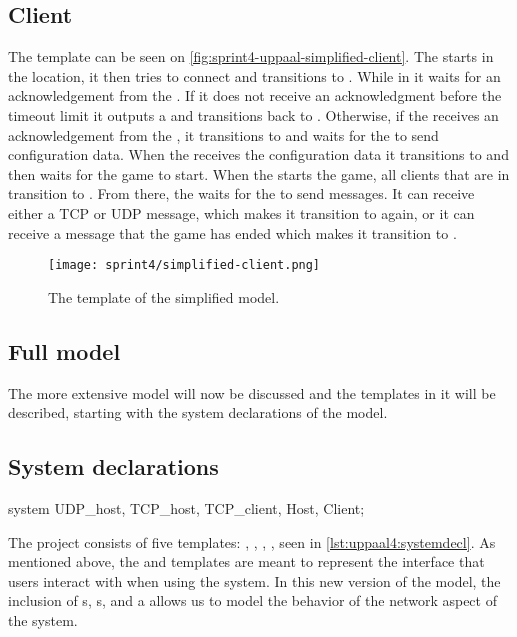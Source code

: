 \subsection*{Client}
The  template can be seen on  \autoref{fig:sprint4-uppaal-simplified-client}.
The  starts in the  location, it then tries to connect and transitions to .
While in  it waits for an acknowledgement from the .
If it does not receive an acknowledgment before the timeout limit it outputs a  and transitions back to .
Otherwise, if the  receives an acknowledgement from the , it transitions to  and waits for the  to send configuration data.
When the  receives the configuration data it transitions to  and then waits for the game to start.
When the  starts the game, all clients that are in  transition to .
From there, the  waits for the  to send messages.
It can receive either a TCP or UDP message, which makes it transition to  again, or it can receive a message that the game has ended which makes it transition to .
\begin{figure}[h]
    \centering
    \texttt{[image: sprint4/simplified-client.png]}
    \caption{The  template of the simplified \uppaal model.}
    \label{fig:sprint4-uppaal-simplified-client}
\end{figure}

\subsection{Full \uppaal model}
The more extensive \uppaal model will now be discussed and the templates in it will be described, starting with the system declarations of the model.

\subsection*{System declarations}
\begin{uppaalcode}[caption={System declarations}, label={lst:uppaal4:systemdecl},captionpos=b]
    system UDP_host, TCP_host, TCP_client, Host, Client;
\end{uppaalcode}
The project consists of five templates: , , , ,  seen in \autoref{lst:uppaal4:systemdecl}.
As mentioned above, the  and  templates are meant to represent the interface that users interact with when using the system.
In this new version of the model, the inclusion of s, s, and a  allows us to model the behavior of the network aspect of the system.

